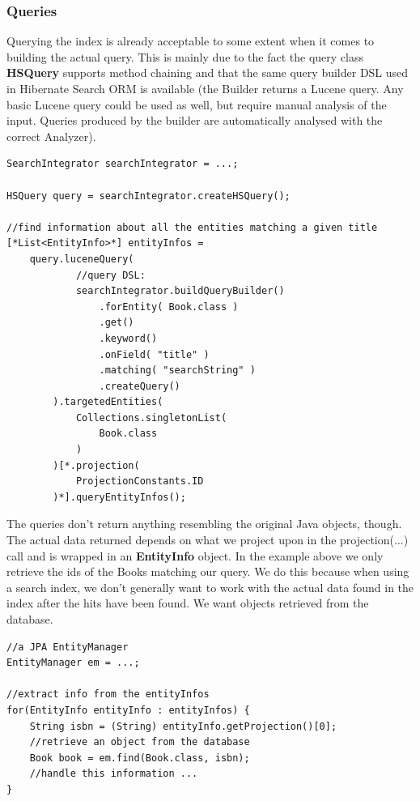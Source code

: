 \pagebreak

\subsubsection{Queries}
Querying the index is already acceptable to some extent when it comes to building the actual query. This is mainly due to the fact the query class \textbf{HSQuery} supports method chaining and that the same query builder DSL used in Hibernate Search ORM is available (the Builder returns a Lucene query. Any basic Lucene query could be used as well, but require manual analysis of the input. Queries produced by the builder are automatically analysed with the correct Analyzer).
\\
\lstset{language=java}
\begin{lstlisting}[frame=htrbl, caption={Querying the index with the engine}, label={lst:querying_natively.java}]
SearchIntegrator searchIntegrator = ...;

HSQuery query = searchIntegrator.createHSQuery();

//find information about all the entities matching a given title
[*List<EntityInfo>*] entityInfos = 
	query.luceneQuery(
			//query DSL:
			searchIntegrator.buildQueryBuilder()
				.forEntity( Book.class )
				.get()
				.keyword()
				.onField( "title" )
				.matching( "searchString" )
				.createQuery()
		).targetedEntities(
			Collections.singletonList(
				Book.class
			)
		)[*.projection(
			ProjectionConstants.ID
		)*].queryEntityInfos();
\end{lstlisting}

\pagebreak
\noindent
The queries don't return anything resembling the original Java objects, though. The actual data returned depends on what we project upon in the projection(...) call and is wrapped in an \textbf{EntityInfo} object. In the example above we only retrieve the ids of the Books matching our query. We do this because when using a search index, we don't generally want to work with the actual data found in the index after the hits have been found. We want objects retrieved from the database.
\\
\lstset{language=java}
\begin{lstlisting}[frame=htrbl, caption={Extracting info from the results}, label={lst:querying_natively.java_2}]
//a JPA EntityManager
EntityManager em = ...;

//extract info from the entityInfos
for(EntityInfo entityInfo : entityInfos) {
	String isbn = (String) entityInfo.getProjection()[0];
	//retrieve an object from the database
	Book book = em.find(Book.class, isbn);
	//handle this information ...
}
\end{lstlisting}

